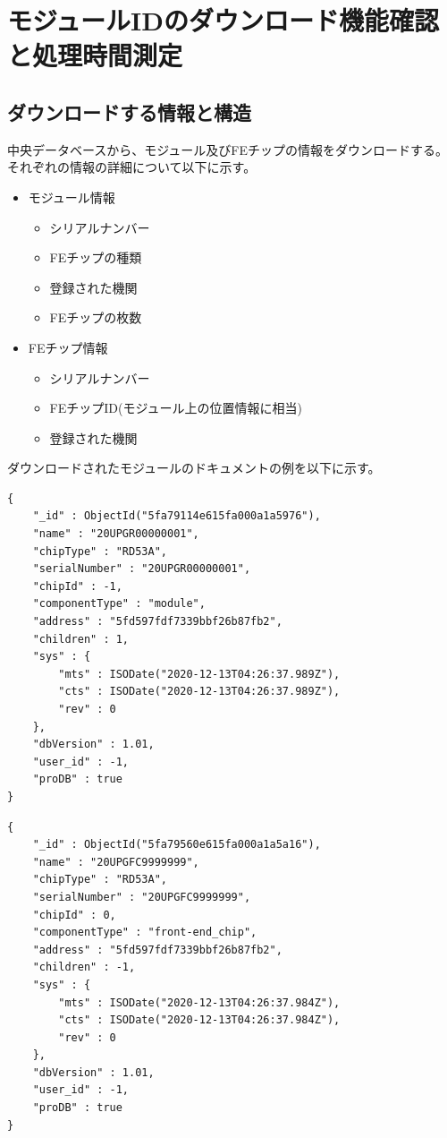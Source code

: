 \section{モジュールIDのダウンロード機能確認と処理時間測定}
\subsection{ダウンロードする情報と構造}
中央データベースから、モジュール及びFEチップの情報をダウンロードする。
それぞれの情報の詳細について以下に示す。
\begin{itemize}
  \item モジュール情報
     \begin{itemize}
       \item シリアルナンバー
       \item FEチップの種類
       \item 登録された機関
       \item FEチップの枚数
     \end{itemize}
  \item FEチップ情報
     \begin{itemize}
       \item シリアルナンバー
       \item FEチップID(モジュール上の位置情報に相当)
       \item 登録された機関
     \end{itemize}
\end{itemize}

ダウンロードされたモジュールのドキュメントの例を以下に示す。
\begin{lstlisting}[caption=モジュール,label=fuga]
{
	"_id" : ObjectId("5fa79114e615fa000a1a5976"),
	"name" : "20UPGR00000001",
	"chipType" : "RD53A",
	"serialNumber" : "20UPGR00000001",
	"chipId" : -1,
	"componentType" : "module",
	"address" : "5fd597fdf7339bbf26b87fb2",
	"children" : 1,
	"sys" : {
		"mts" : ISODate("2020-12-13T04:26:37.989Z"),
		"cts" : ISODate("2020-12-13T04:26:37.989Z"),
		"rev" : 0
	},
	"dbVersion" : 1.01,
	"user_id" : -1,
	"proDB" : true
}
\end{lstlisting}
\begin{lstlisting}[caption=FEチップ,label=fuga]
{
	"_id" : ObjectId("5fa79560e615fa000a1a5a16"),
	"name" : "20UPGFC9999999",
	"chipType" : "RD53A",
	"serialNumber" : "20UPGFC9999999",
	"chipId" : 0,
	"componentType" : "front-end_chip",
	"address" : "5fd597fdf7339bbf26b87fb2",
	"children" : -1,
	"sys" : {
		"mts" : ISODate("2020-12-13T04:26:37.984Z"),
		"cts" : ISODate("2020-12-13T04:26:37.984Z"),
		"rev" : 0
	},
	"dbVersion" : 1.01,
	"user_id" : -1,
	"proDB" : true
}
\end{lstlisting}

